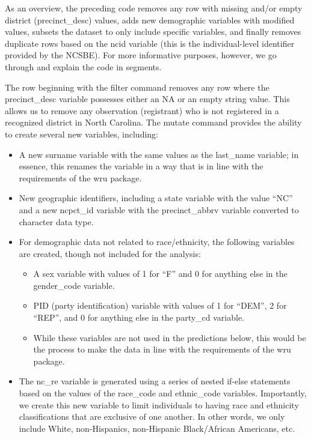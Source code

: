 \documentclass[
]{article}
\providecommand{\tightlist}{%
  \setlength{\itemsep}{0pt}\setlength{\parskip}{0pt}}
\begin{document}
As an overview, the preceding code removes any row with missing and/or
empty district (precinct\_desc) values, adds new demographic variables
with modified values, subsets the dataset to only include specific
variables, and finally removes duplicate rows based on the ncid variable
(this is the individual-level identifier provided by the NCSBE). For
more informative purposes, however, we go through and explain the code
in segments.

The row beginning with the filter command removes any row where the
precinct\_desc variable possesses either an NA or an empty string value.
This allows us to remove any observation (registrant) who is not
registered in a recognized district in North Carolina. The mutate
command provides the ability to create several new variables, including:

\begin{itemize}
\tightlist
\item
  A new surname variable with the same values as the last\_name
  variable; in essence, this renames the variable in a way that is in
  line with the requirements of the wru package.
\item
  New geographic identifiers, including a state variable with the value
  ``NC'' and a new ncpct\_id variable with the precinct\_abbrv variable
  converted to character data type.
\item
  For demographic data not related to race/ethnicity, the following
  variables are created, though not included for the analysis:

  \begin{itemize}
  \tightlist
  \item
    A sex variable with values of 1 for ``F'' and 0 for anything else in
    the gender\_code variable.
  \item
    PID (party identification) variable with values of 1 for ``DEM'', 2
    for ``REP'', and 0 for anything else in the party\_cd variable.
  \item
    While these variables are not used in the predictions below, this
    would be the process to make the data in line with the requirements
    of the wru package.
  \end{itemize}
\item
  The nc\_re variable is generated using a series of nested if-else
  statements based on the values of the race\_code and ethnic\_code
  variables. Importantly, we create this new variable to limit
  individuals to having race and ethnicity classifications that are
  exclusive of one another. In other words, we only include White,
  non-Hispanics, non-Hispanic Black/African Americans, etc.
\end{itemize}
\end{document}
